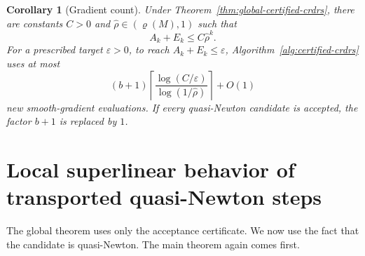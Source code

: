 \documentclass[10pt,leqno]{amsart}
\numberwithin{equation}{section}
\numberwithin{algorithm}{section}
\newtheorem{corollary}[theorem]{Corollary}
\theoremstyle{remark}
\begin{document}
\begin{corollary}[Gradient count]
\label{cor:global-gradient-count}
Under Theorem~\ref{thm:global-certified-crdrs}, there are constants $C>0$ and $\widehat\rho\in(\varrho(M),1)$ such that
\[
    A_k+E_k\le C\widehat\rho^k.
\]
For a prescribed target $\varepsilon>0$, to reach $A_k+E_k\le\varepsilon$, Algorithm~\ref{alg:certified-crdrs} uses at most
\begin{equation}
\label{eq:fixed-gradient-count}
    (b+1)\left\lceil
    \frac{\log(C/\varepsilon)}{\log(1/\widehat\rho)}
    \right\rceil+O(1)
\end{equation}
new smooth-gradient evaluations.  If every quasi-Newton candidate is accepted, the factor $b+1$ is replaced by $1$.
\end{corollary}

\section{Local superlinear behavior of transported quasi-Newton steps}
\label{sec:superlinear}

The global theorem uses only the acceptance certificate.  We now use the fact that the candidate is quasi-Newton.  The main theorem again comes first.
\end{document}
